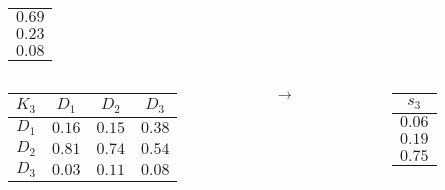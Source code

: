 \documentclass{beamer}
\begin{document}
\begin{frame}
\begin{columns}
\begin{column}{0.1\textwidth}
\begin{table}
\begin{tabular}{c}
				$0.69$\\
				$0.23$\\
				$0.08$
				\end{tabular}
			\end{table}
		\end{column}
	\end{columns}
	\begin{columns}
		\begin{column}{0.4\textwidth}
			\begin{table}
				\begin{tabular}{c|c|c|c}
				$K_3$	&	$D_1$	&	$D_2$	&	$D_3$\\ \hline
				$D_1$	&	$0.16$	&	$0.15$	&	$0.38$\\ \hline
				$D_2$	&	$0.81$	&	$0.74$	&	$0.54$\\ \hline
				$D_3$	&	$0.03$	&	$0.11$	&	$0.08$
				\end{tabular}
			\end{table}
		\end{column}
		\begin{column}{0.1\textwidth}
			$\rightarrow$
		\end{column}
		\begin{column}{0.1\textwidth}
			\begin{table}
				\begin{tabular}{c}
				$s_3$\\ \hline
				$0.06$\\
				$0.19$\\
				$0.75$
				\end{tabular}
			\end{table}
		\end{column}
	\end{columns}
\end{frame}
\end{document}
